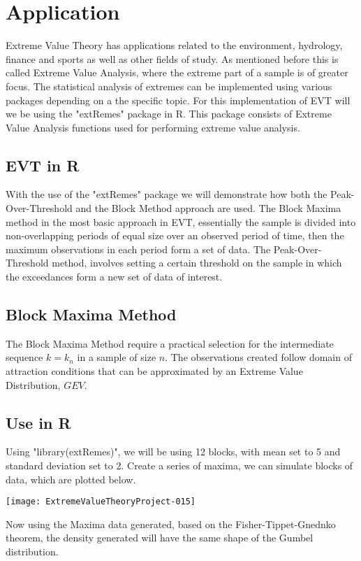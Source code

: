 \documentclass[11pt,a4paper]{article}
\theoremstyle{plain}
\begin{document}
\newpage
\section{Application}
Extreme Value Theory has applications related to the environment, hydrology, finance and sports as well as other fields of study. As mentioned before this is called Extreme Value Analysis, where the extreme part of a sample is of greater focus. The statistical analysis of extremes can be implemented using various packages depending on a the specific topic. For this implementation of EVT will we be using the  "extRemes" package in R. This package consists of Extreme Value Analysis functions used for performing extreme value analysis.

\subsection{EVT in R}
With the use of the "extRemes" package we will demonstrate how both the Peak-Over-Threshold and the Block Method approach are used. The Block Maxima method in the most basic approach in EVT, essentially the sample is divided  into non-overlapping periods of equal size over an observed period of time, then the maximum observations in each period form a set of data. The Peak-Over-Threshold method, involves setting a certain threshold on the sample in which the exceedances form a new set of data of interest.

\subsection*{Block Maxima Method}
The Block Maxima Method require a practical selection for the intermediate sequence $k = k_n$ in a sample of size $n$. The observations created follow domain of attraction conditions that can be approximated by an Extreme Value Distribution, $GEV$.

\subsection*{Use in R}
Using "library(extRemes)", we will be using 12 blocks, with mean set to 5 and standard deviation set to 2. Create a series of maxima, we can simulate blocks of data, which are plotted below.

\texttt{[image: ExtremeValueTheoryProject-015]}

Now using the Maxima data generated, based on the Fisher-Tippet-Gnednko theorem, the density generated will have the same shape of the Gumbel distribution. 
\end{document}
